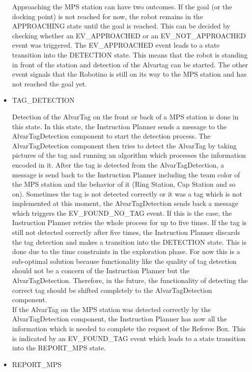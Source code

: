\begin{itemize}
Approaching the MPS station can have two outcomes. If the goal (or the docking point) is not reached for now, the robot remains in the APPROACHING state until the goal is reached. This can be decided by checking whether an EV\_APPROACHED or an EV\_NOT\_APPROACHED event was triggered. The EV\_APPROACHED event leads to a state transition into the DETECTION state. This means that the robot is standing in front of the station and detection of the Alvartag can be started. The other event signals that the Robotino is still on its way to the MPS station and has not reached the goal yet.  


\item TAG\_DETECTION

Detection of the AlvarTag on the front or back of a MPS station is done in this state. In this state, the Instruction Planner sends a message to the AlvarTagDetection component to start the detection process. The AlvarTagDetection component then tries to detect the AlvarTag by taking pictures of the tag and running an algorithm which processes the information encoded in it. After the tag is detected from the AlvarTagDetection, a message is send back to the Instruction Planner including the team color of the MPS station and the behavior of it (Ring Station, Cap Station and so on). Sometimes the tag is not detected correctly or it was a tag which is not implemented at this moment, the AlvarTagDetection sends back a message which triggers the EV\_FOUND\_NO\_TAG event. If this is the case, the Instruction Planner retries the whole process for up to five times. If the tag is still not detected correctly after five times, the Instruction Planner discards the tag detection and makes a transition into the DETECTION state. This is done due to the time constraints in the exploration phase. For now this is a sub-optimal solution because functionality like the quality of tag detection should not be a concern of the Instruction Planner but the AlvarTagDetection. Therefore, in the future, the functionality of detecting the correct tag should be shifted completely to the AlvarTagDetection component. \\

If the AlvarTag on the MPS station was detected correctly by the AlvarTagDetection component, the Instruction Planner has now all the information which is needed to complete the request of the Referee Box. This is indicated by an EV\_FOUND\_TAG event which leads to a state transition into the REPORT\_MPS state.


\item REPORT\_MPS


\end{itemize}
